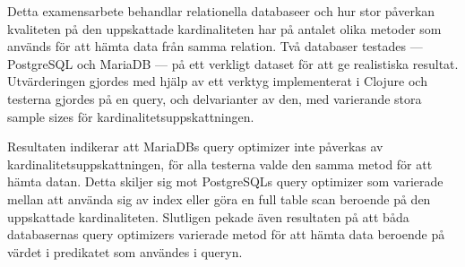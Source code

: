 Detta examensarbete behandlar relationella databaseer och hur stor
påverkan kvaliteten på den uppskattade kardinaliteten har på antalet olika
metoder som används för att hämta data från samma relation. Två databaser
testades --- PostgreSQL och MariaDB --- på ett verkligt dataset för att ge
realistiska resultat. Utvärderingen gjordes med hjälp av ett verktyg
implementerat i Clojure och testerna gjordes på en query, och delvarianter av
den, med varierande stora sample sizes för kardinalitetsuppskattningen.

Resultaten indikerar att MariaDBs query optimizer inte påverkas av
kardinalitetsuppskattningen, för alla testerna valde den samma metod för att
hämta datan. Detta skiljer sig mot PostgreSQLs query optimizer som varierade
mellan att använda sig av index eller göra en full table scan beroende på den
uppskattade kardinaliteten. Slutligen pekade även resultaten på att båda
databasernas query optimizers varierade metod för att hämta data beroende på
värdet i predikatet som användes i queryn.